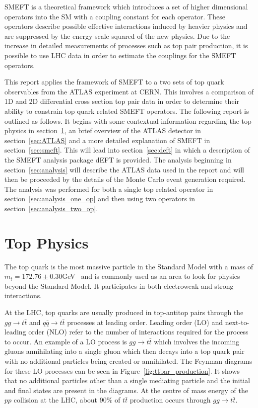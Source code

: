 \documentclass[a4paper,11pt]{article}
\begin{document}
SMEFT is a theoretical framework which introduces a set of higher dimensional operators into the SM with a coupling constant for each operator.
These operators describe possible effective interactions induced by heavier physics and are suppressed by the energy scale squared of the new physics.
Due to the increase in detailed measurements of processes such as top pair production, it is possible to use LHC data in order to estimate the couplings for the SMEFT operators.

This report applies the framework of SMEFT to a two sets of top quark observables from the ATLAS experiment at CERN.
This involves a comparison of 1D and 2D differential cross section top pair data in order to determine their ability to constrain top quark related SMEFT operators.
The following report is outlined as follows.
It begins with some contextual information regarding the top physics in section~\ref{sec:topquarks}, an brief overview of the ATLAS detector in section~\ref{sec:ATLAS} and a more detailed explanation of SMEFT in section~\ref{sec:smeft}.
This will lead into section~\ref{sec:deft} in which a description of the SMEFT analysis package dEFT is provided.
The analysis beginning in section~\ref{sec:analysis} will describe the ATLAS data used in the report and will then be proceeded by the details of the Monte Carlo event generation required.
The analysis was performed for both a single top related operator in section~\ref{sec:analysis_one_op} and then using two operators in section~\ref{sec:analysis_two_op}.

\section{Top Physics}\label{sec:topquarks}

The top quark is the most massive particle in the Standard Model with a mass of $m_{t} =172.76\pm0.30$GeV~\cite{ParticleDataGroup:2020ssz} and is commonly used as an area to look for physics beyond the Standard Model.
It participates in both electroweak and strong interactions.

At the LHC, top quarks are usually produced in top-antitop pairs through the $gg\rightarrow t\bar{t}$ and $q\bar{q}\rightarrow t\bar{t}$ processes at leading order.
Leading order (LO) and next-to-leading order (NLO) refer to the number of interactions required for the process to occur.
An example of a LO process is $gg\rightarrow t\bar{t}$ which involves the incoming gluons annihilating into a single gluon which then decays into a top quark pair with no additional particles being created or annihilated.
The Feynman diagrams for these LO processes can be seen in Figure~\ref{fig:ttbar_production}.
It shows that no additional particles other than a single mediating particle and the initial and final states are present in the diagrams.
At the centre of mass energy of the $pp$ collision at the LHC, about 90\% of $t\bar{t}$ production occurs through $gg\rightarrow t\bar{t}$.
\end{document}

